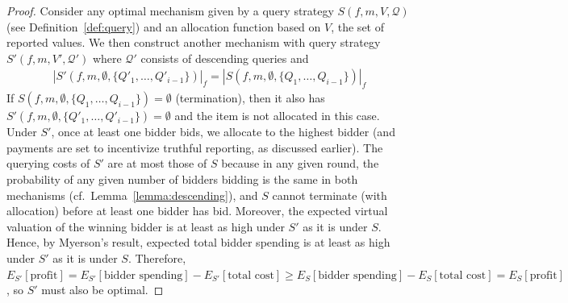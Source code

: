 \begin{proof}
Consider any optimal mechanism given by a
query strategy $S(f, m, V, \mathcal Q)$ (see Definition~\ref{def:query}) and an
allocation function based on $V$, the set of reported values.
We then construct another mechanism
with query strategy $S'(f, m, V', \mathcal Q')$ where $\mathcal Q'$
consists of descending queries
and 
\begin{align*}
|S'(f, m, \emptyset, \{Q'_1, \ldots, Q'_{i-1}\})|_f %
  = |S(f, m, \emptyset, \{Q_1, \ldots, Q_{i-1}\})|_f
\end{align*}
If $S(f, m, \emptyset, \{Q_1, \ldots,
Q_{i-1}\})=\emptyset$ (termination), then it also has
$S'(f, m, \emptyset, \{Q'_1, \ldots, Q'_{i-1}\})=\emptyset$ 
and the item is not allocated in this case.
Under $S'$, once at least one bidder bids, we allocate to the highest
bidder (and payments are set to incentivize truthful reporting, as
discussed earlier).  The querying costs of $S'$ are at most those of $S$
because in any given round, the probability of any given number of bidders
bidding is the same in both mechanisms (cf.~Lemma~\ref{lemma:descending}), 
and $S$ cannot terminate (with allocation) before at least one bidder has bid. 
Moreover, the expected virtual valuation of the winning bidder is at
least as high under $S'$ as it is under $S$.
Hence, by Myerson's result, expected total bidder spending is at least 
as high under $S'$ as it is under $S$.
Therefore,
 $E_{S'}[\text{profit}]
= E_{S'}[\text{bidder spending}] - E_{S'}[\text{total cost}]
 \geq E_{S}[\text{bidder spending}] - E_{S}[\text{total cost}]
= E_{S}[\text{profit}]$, so $S'$ must also be optimal.

\end{proof}
